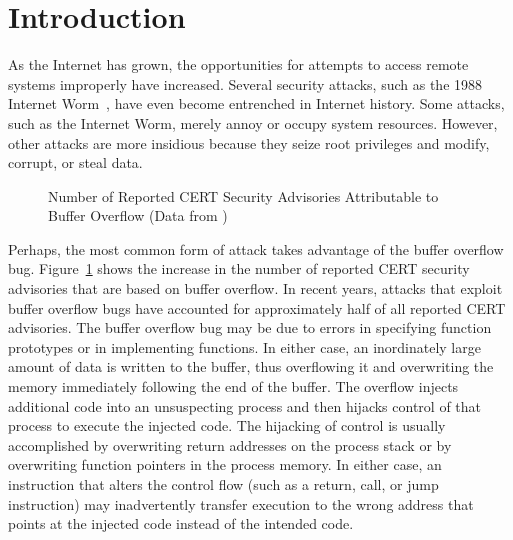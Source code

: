 \documentclass[]{article}
\begin{document}

\section{Introduction}
\label{sec:introduction}

As the Internet has grown, the opportunities for attempts to access remote
systems improperly have increased.  Several security attacks, such as the 1988
Internet Worm~\cite{SSP89*326,Rochlis89,Seeley89}, have even become entrenched
in Internet history.  Some attacks, such as the Internet Worm, merely annoy or
occupy system resources.  However, other attacks are more insidious because
they seize root privileges and modify, corrupt, or steal data.

\begin{figure}[htbp]
\centerline{
	\hspace{.2in}
}
\caption{Number of Reported CERT Security Advisories Attributable to Buffer
	Overflow (Data from \cite{wagner00})}
\label{fig:attack_increase}
\end{figure}

Perhaps, the most common form of attack takes advantage of the buffer overflow
bug.  Figure~\ref{fig:attack_increase} shows the increase in the number of
reported CERT \cite{cert} security advisories that are based on buffer
overflow.  In recent years, attacks that exploit buffer overflow bugs have
accounted for approximately half of all reported CERT advisories.  The buffer
overflow bug may be due to errors in specifying function prototypes or in
implementing functions.  In either case, an inordinately large amount of data
is written to the buffer, thus overflowing it and overwriting the memory
immediately following the end of the buffer.  The overflow injects additional
code into an unsuspecting process and then hijacks control of that process to
execute the injected code.  The hijacking of control is usually accomplished by
overwriting return addresses on the process stack or by overwriting function
pointers in the process memory.  In either case, an instruction that alters the
control flow (such as a return, call, or jump instruction) may inadvertently
transfer execution to the wrong address that points at the injected code
instead of the intended code.
\end{document}
